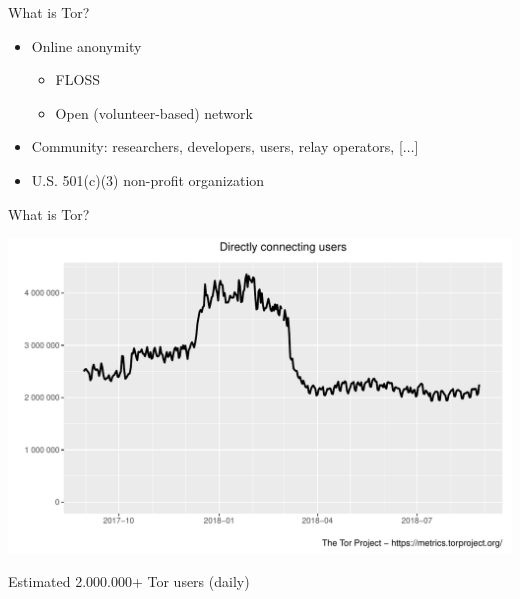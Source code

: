 \documentclass[aspectratio=169,10pt]{beamer}
\begin{document}
  
  \begin{frame}[fragile]{What is Tor?}
    \begin{itemize}
      \item Online anonymity
      \begin{itemize}
        \item FLOSS
        \item Open (volunteer-based) network
      \end{itemize}
      \item Community: researchers, developers, users, relay operators, [$\ldots$]
      \item U.S. 501(c)(3) non-profit organization
    \end{itemize}
  \end{frame}
  
  
  \begin{frame}[fragile]{What is Tor?}
    \begin{center}
      \href{https://metrics.torproject.org/userstats-relay-country.html}{\includegraphics[height=0.75\textheight]{img/userstats.pdf}}
      
      Estimated 2.000.000+ Tor users (daily)
    \end{center}
  \end{frame}
  
\end{document}
